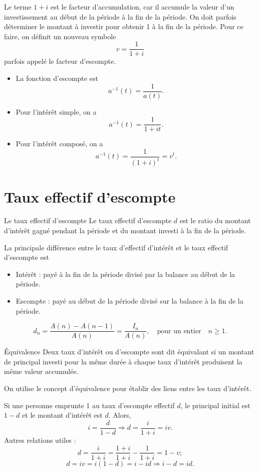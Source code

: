 Le terme $1 + i$ est le facteur d'accumulation, car il accumule la valeur d'un investissement au début de la période à la fin de la période. On doit parfois déterminer le montant à investir pour obtenir 1 à la fin de la période. Pour ce faire, on définit un nouveau symbole $$v = \frac{1}{1 + i}$$ parfois appelé le facteur d'escompte. 

\begin{itemize}
	\item La fonction d'escompte est 
	$$a^{-1}(t) = \frac{1}{a(t)}.$$
	\item Pour l'intérêt simple, on a 
	$$a^{-1}(t) = \frac{1}{1 + it}.$$
	\item Pour l'intérêt composé, on a 
	$$a^{-1}(t) = \frac{1}{(1 + i)^t} = v^t.$$
\end{itemize}

\section{Taux effectif d'escompte}

\begin{definition}{Le taux effectif d'escompte}{}
	Le taux effectif d'escompte $d$ est le ratio du montant d'intérêt gagné pendant la période et du montant investi à la fin de la période.
\end{definition}

La principale différence entre le taux d'effectif d'intérêt et le taux effectif d'escompte est 
\begin{itemize}
	\item Intérêt : payé à la fin de la période divisé par la balance au début de la période.
	\item Escompte : payé au début de la période divisé sur la balance à la fin de la période. 
\end{itemize}

$$d_n = \frac{A(n) - A(n-1)}{A(n)} = \frac{I_n}{A(n)}, \quad \text{pour un entier} \quad n \geq 1.$$

\begin{definition}{Équivalence}{}
	Deux taux d'intérêt ou d'escompte sont dit équivalant si un montant de principal investi pour la même durée à chaque taux d'intérêt produisent la même valeur accumulée. 
\end{definition}

On utilise le concept d'équivalence pour établir des liens entre les taux d'intérêt. 

Si une personne emprunte 1 au taux d'escompte effectif $d$, le principal initial est $1-d$ et le montant d'intérêt est $d$. Alors, 
$$i = \frac{d}{1-d} \Rightarrow d = \frac{i}{1 + i} = iv.$$
Autres relations utiles : 
$$d = \frac{i}{1 + i} = \frac{1 + i}{1 + i} - \frac{1}{1 + i} = 1 - v;$$
$$d = iv = i(1-d) = i - id \Rightarrow i - d = id.$$

